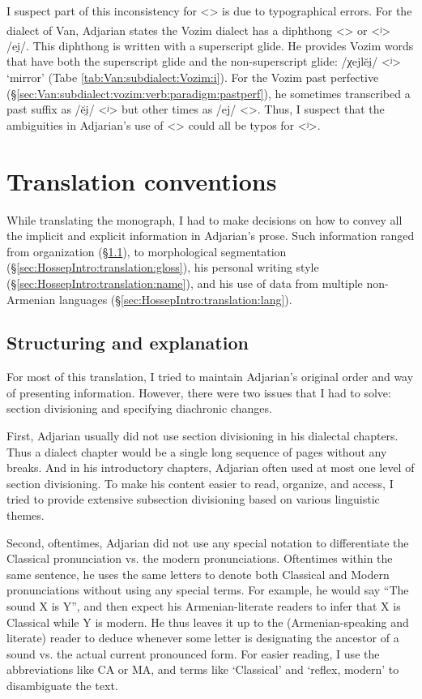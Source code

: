 I suspect part of this inconsistency for <> is due to typographical errors. For the dialect of Van, Adjarian states the Vozim dialect has a diphthong <\textsuperscript{}> or <ʲ> /ei̯/. This diphthong is written with a superscript glide. He provides Vozim words that have both the superscript glide and the non-superscript glide: /χejlĕi̯/ <ʲ> `mirror' (Tabe \ref{tab:Van:subdialect:Vozim:i}).   For the Vozim past perfective (\S\ref{sec:Van:subdialect:vozim:verb:paradigm:pastperf}), he sometimes transcribed a past suffix as /ĕi̯/ <ʲ> but other times as /ej/ <>. Thus, I suspect that the ambiguities in Adjarian's use of <> could all be typos for <ʲ>. 


 

\section{Translation conventions}\label{sec:HossepIntro:translation}
While translating the monograph, I had to make decisions on how to convey all the implicit and explicit information in Adjarian's prose. Such information ranged from organization (\S\ref{sec:HossepIntro:translation:exp}), to morphological segmentation (\S\ref{sec:HossepIntro:translation:gloss}),   his personal writing style (\S\ref{sec:HossepIntro:translation:name}), and his use of data from multiple non-Armenian languages (\S\ref{sec:HossepIntro:translation:lang}).
\subsection{Structuring and explanation}\label{sec:HossepIntro:translation:exp}
For most of this translation, I tried to maintain Adjarian's original order and way of presenting information. However, there were two issues that I had to solve: section divisioning and specifying diachronic changes. 


First, Adjarian usually did not use section divisioning in his dialectal chapters. Thus a dialect chapter would be a single long sequence of pages without any breaks. And in his introductory chapters, Adjarian often used at most one level of section divisioning. To make his content easier to read, organize, and access, I tried to provide extensive subsection divisioning based on various linguistic themes. 

Second,  oftentimes, Adjarian did not use any special notation to differentiate the Classical pronunciation vs. the modern pronunciations. Oftentimes within the same sentence, he uses the same letters to denote both Classical and Modern pronunciations without using any special terms. For example, he would say  ``The sound X is Y'', and then expect his Armenian-literate readers to  infer that X is Classical while Y is modern. He thus leaves it up to the (Armenian-speaking and literate) reader to deduce whenever some letter is designating the ancestor of a sound vs. the actual current pronounced form. 	For easier reading, I use the abbreviations like CA or MA, and terms like `Classical' and `reflex, modern' to disambiguate the text.   


